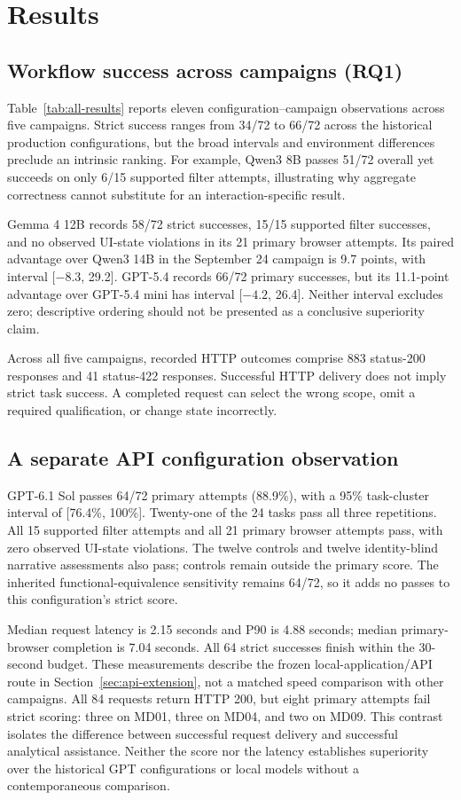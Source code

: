 \documentclass[10pt,twocolumn,letterpaper]{article}
\begin{document}
\section{Results}
\subsection{Workflow success across campaigns (RQ1)}
Table~\ref{tab:all-results} reports eleven configuration--campaign observations across five campaigns. Strict success ranges from 34/72 to 66/72 across the historical production configurations, but the broad intervals and environment differences preclude an intrinsic ranking. For example, Qwen3 8B passes 51/72 overall yet succeeds on only 6/15 supported filter attempts, illustrating why aggregate correctness cannot substitute for an interaction-specific result.

Gemma 4 12B records 58/72 strict successes, 15/15 supported filter successes, and no observed UI-state violations in its 21 primary browser attempts. Its paired advantage over Qwen3 14B in the September 24 campaign is 9.7 points, with interval [$-8.3$, 29.2]. GPT-5.4 records 66/72 primary successes, but its 11.1-point advantage over GPT-5.4 mini has interval [$-4.2$, 26.4]. Neither interval excludes zero; descriptive ordering should not be presented as a conclusive superiority claim.

Across all five campaigns, recorded HTTP outcomes comprise 883 status-200 responses and 41 status-422 responses. Successful HTTP delivery does not imply strict task success. A completed request can select the wrong scope, omit a required qualification, or change state incorrectly.



\subsection{A separate API configuration observation}
GPT-6.1 Sol passes 64/72 primary attempts (88.9\%), with a 95\% task-cluster interval of [76.4\%, 100\%]. Twenty-one of the 24 tasks pass all three repetitions. All 15 supported filter attempts and all 21 primary browser attempts pass, with zero observed UI-state violations. The twelve controls and twelve identity-blind narrative assessments also pass; controls remain outside the primary score. The inherited functional-equivalence sensitivity remains 64/72, so it adds no passes to this configuration's strict score.

Median request latency is 2.15 seconds and P90 is 4.88 seconds; median primary-browser completion is 7.04 seconds. All 64 strict successes finish within the 30-second budget. These measurements describe the frozen local-application/API route in Section~\ref{sec:api-extension}, not a matched speed comparison with other campaigns. All 84 requests return HTTP 200, but eight primary attempts fail strict scoring: three on MD01, three on MD04, and two on MD09. This contrast isolates the difference between successful request delivery and successful analytical assistance. Neither the score nor the latency establishes superiority over the historical GPT configurations or local models without a contemporaneous comparison.
\end{document}
